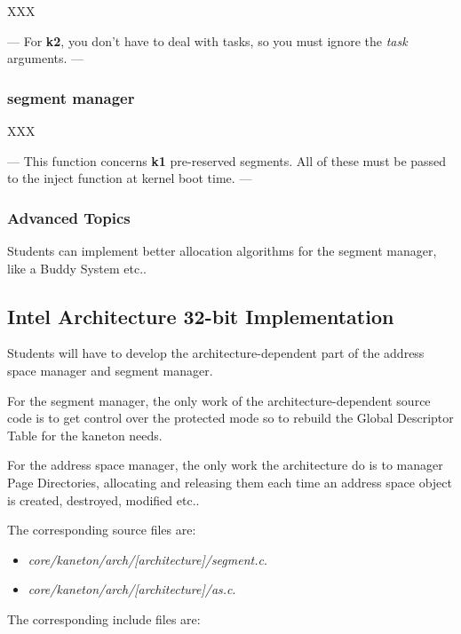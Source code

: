 XXX

	    ---
	    For \textbf{k2}, you don't have to deal with tasks, so you must
	    ignore the \textit{task} arguments.
	    ---

%
%

\subsubsection{segment manager}

XXX


	   ---
	    This function concerns \textbf{k1} pre-reserved segments.
	    All of these must be passed to the inject function at kernel
	    boot time.
	    ---

%
%

\subsubsection{Advanced Topics}

Students can implement better allocation algorithms for the segment manager,
like a Buddy System etc..

%
%

\subsection{Intel Architecture 32-bit Implementation}

Students will have to develop the architecture-dependent part of the
address space manager and segment manager.

For the segment manager, the only work of the architecture-dependent source
code is to get control over the protected mode so to rebuild the Global
Descriptor Table for the kaneton needs.

For the address space manager, the only work the architecture do is to
manager Page Directories, allocating and releasing them each time an
address space object is created, destroyed, modified etc..

The corresponding source files are:

\begin{itemize}
  \item
    \textit{core/kaneton/arch/[architecture]/segment.c}.
  \item
    \textit{core/kaneton/arch/[architecture]/as.c}.
\end{itemize}

The corresponding include files are:

